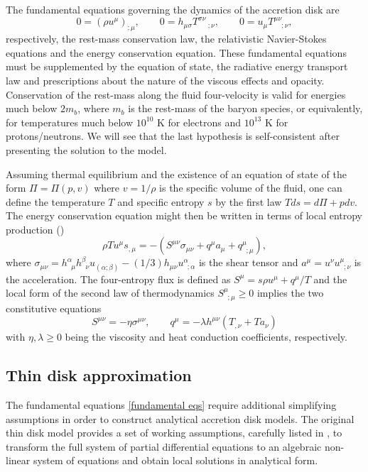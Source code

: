 \documentclass[a4paper,fleqn,usenatbib]{mnrasMOD}
\numberwithin{equation}{section}
\newcommand{\be}{\begin{equation}}
\newcommand{\ee}{\end{equation}}
\begin{document}
The fundamental equations governing the dynamics of the accretion disk are
\begin{equation} \label{fundamental eqs}
0 = \left(\rho u^{\mu}\right)_{; \mu}, \qquad 0 = h_{\mu\sigma}T^{\sigma\nu}_{\;\;\;\;\; ; \nu}, \qquad
0 = u_{\mu}T^{\mu\nu}_{\;\;\;\; ; \nu},
\end{equation}
respectively, the rest-mass conservation law, the relativistic Navier-Stokes equations and the energy conservation equation. These fundamental equations must be supplemented by the equation of state, the radiative energy transport law and prescriptions about the nature of the viscous effects and opacity.  Conservation of the rest-mass along the fluid four-velocity is valid for energies much below $2m_b$, where $m_b$ is the rest-mass of the baryon species, or equivalently, for temperatures much below $10^{10}$ K for electrons and $10^{13}$ K for protons/neutrons. We will see that the last hypothesis is self-consistent after presenting the solution to the model. 

Assuming thermal equilibrium and the existence of an equation of state of the form $\Pi=\Pi(p,v)$ where $v=1/\rho$ is the specific volume of the fluid, one can define the temperature $T$ and specific entropy $s$ by the first law $T ds = d\Pi +p dv$. The energy conservation equation might then be written in terms of local entropy production (\cite{Ellis:1971pg})
\be
\rho T u^{\mu}s_{,\mu} = - \left( S^{\mu\nu}\sigma_{\mu\nu} + q^{\mu}a_{\mu} + q^{\mu}_{\;\; ;\mu}\right),
\ee
where $\sigma_{\mu\nu} = h^{\alpha}_{\;\; \mu}h^{\beta}_{\;\; \nu}u_{(\alpha ; \beta)} - (1/3)h_{\mu\nu}u^{\alpha}_{\;\; ;\alpha}$ is the shear tensor and $a^{\mu} = u^{\nu}u^{\mu}_{\;\; ;\nu}$ is the acceleration. The four-entropy flux is defined as $S^{\mu} = s \rho u^{\mu} + q^{\mu}/T$ and the local form of the second law of thermodynamics $S^{\mu}_{\;\; ;\mu} \geq 0$ implies the two constitutive equations 
\be\label{consrel}
S^{\mu\nu} = - \eta \sigma^{\mu\nu}, \qquad q^{\mu} = -\lambda h^{\mu\nu}\left(T_{,\nu} + T a_{\nu}\right)
\ee
with $\eta, \lambda \geq 0$ being the viscosity and heat conduction coefficients, respectively.



\subsection{Thin disk approximation}\label{sec:2}
The fundamental equations \eqref{fundamental eqs} require additional simplifying assumptions in order to construct analytical accretion disk models. The original thin disk model provides a set of working assumptions, carefully listed in \cite{25341}, to transform the full system of partial differential equations to an algebraic non-linear system of equations and obtain local solutions in analytical form.
\end{document}
